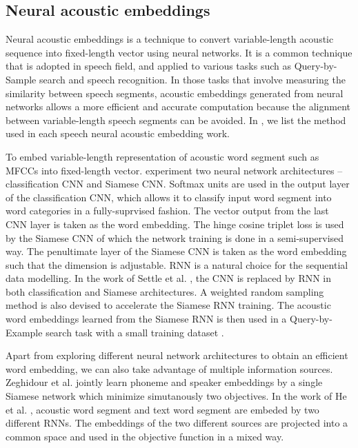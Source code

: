 \subsection{Neural acoustic embeddings}

Neural acoustic embeddings is a technique to convert variable-length acoustic sequence into fixed-length vector using neural networks. It is a common technique that is adopted in speech field, and applied to various tasks such as Query-by-Sample search and speech recognition. In those tasks that involve measuring the similarity between speech segments, acoustic embeddings generated from neural networks allows a more efficient and accurate computation because the alignment between variable-length speech segments can be avoided. In , we list the method used in each speech neural acoustic embedding work.

To embed variable-length representation of acoustic word segment such as MFCCs into fixed-length vector.  experiment two neural network architectures -- classification CNN and Siamese CNN. Softmax units are used in the output layer of the classification CNN, which allows it to classify input word segment into word categories in a fully-suprvised fashion. The vector output from the last CNN layer is taken as the word embedding. The hinge cosine triplet loss is used by the Siamese CNN of which the network training is done in a semi-supervised way. The penultimate layer of the Siamese CNN is taken as the word embedding such that the dimension is adjustable. RNN is a natural choice for the sequential data modelling. In the work of Settle et al. , the CNN is replaced by RNN in both classification and Siamese architectures. A weighted random sampling method is also devised to accelerate the Siamese RNN training. The acoustic word embeddings learned from the Siamese RNN is then used in a Query-by-Example search task with a small training dataset .

Apart from exploring different neural network architectures to obtain an efficient word embedding, we can also take advantage of multiple information sources. Zeghidour et al.  jointly learn phoneme and speaker embeddings by a single Siamese network which minimize simutanously two objectives. In the work of He et al. , acoustic word segment and text word segment are embeded by two different RNNs. The embeddings of the two different sources are projected into a common space and used in the objective function in a mixed way. 

